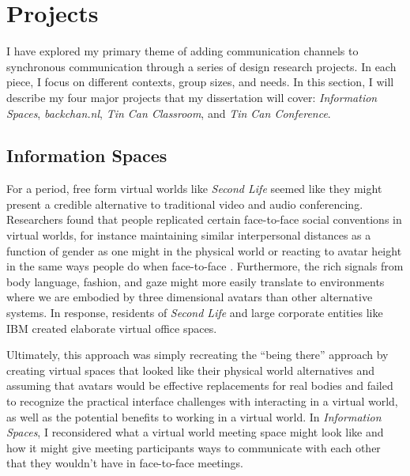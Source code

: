 \documentclass{tufte-handout}
\begin{document}
\section{Projects}

I have explored my primary theme of adding communication channels to synchronous communication through a series of design research projects. In each piece, I focus on different contexts, group sizes, and needs. In this section, I will describe my four major projects that my dissertation will cover: \emph{Information Spaces}, \emph{backchan.nl}, \emph{Tin Can Classroom}, and \emph{Tin Can Conference}. 


\subsection{Information Spaces}


For a period, free form virtual worlds  like \emph{Second Life} seemed like they might present a credible alternative to traditional video and audio conferencing. Researchers found that people replicated certain face-to-face social conventions in virtual worlds, for instance maintaining similar interpersonal distances as a function of gender as one might in the physical world \citep{Yee:2007cl} or reacting to avatar height in the same ways people do when face-to-face \citep{Yee:2009vt}. Furthermore, the rich signals from body language, fashion, and gaze might more easily translate to environments where we are embodied by three dimensional avatars than other alternative systems. In response, residents of \emph{Second Life} and large corporate entities like IBM \citep{Shami:2010vi} created elaborate virtual office spaces.

Ultimately, this approach was simply recreating the ``being there'' approach by creating virtual spaces that looked like their physical world alternatives and assuming that avatars would be effective replacements for real bodies and failed to recognize the practical interface challenges with interacting in a virtual world, as well as the potential benefits to working in a virtual world. In \emph{Information Spaces}, I reconsidered what a virtual world meeting space might look like and how it might give meeting participants ways to communicate with each other that they wouldn't have in face-to-face meetings. 
\end{document}
